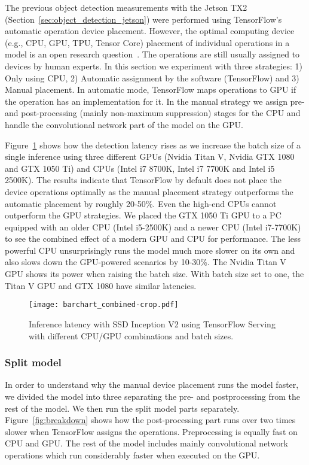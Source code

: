 \documentclass[sigconf]{acmart}
\begin{document}
The previous object detection measurements with the Jetson TX2 (Section~\ref{sec:object_detection_jetson}) were performed using TensorFlow's automatic operation device placement. However, the optimal computing device (e.g., CPU, GPU, TPU, Tensor Core) placement of individual operations in a model is an open research question~\cite{mirhoseini17icml}. The operations are still usually assigned to devices by human experts. In this section we experiment with three strategies: 1) Only using CPU, 2) Automatic assignment by the software (TensorFlow) and 3) Manual placement. In automatic mode, TensorFlow maps operations to GPU if the operation has an implementation for it. In the manual strategy we assign pre- and post-processing (mainly non-maximum suppression) stages for the CPU and handle the convolutional network part of the model on the GPU.

Figure~\ref{fig:barchart_combined} shows how the detection latency rises as we increase the batch size of a single inference using three different GPUs (Nvidia Titan V, Nvidia GTX 1080 and GTX 1050 Ti) and CPUs (Intel i7 8700K, Intel i7 7700K and Intel i5 2500K). The results indicate that TensorFlow by default does not place the device operations optimally as the manual placement strategy outperforms the automatic placement by roughly 20-50\%. Even the high-end CPUs cannot outperform the GPU strategies. We placed the GTX 1050 Ti GPU to a PC equipped with an older CPU (Intel i5-2500K) and a newer CPU (Intel i7-7700K) to see the combined effect of a modern GPU and CPU for performance. The less powerful CPU unsurprisingly runs the model much more slower on its own and also slows down the GPU-powered scenarios by 10-30\%. The Nvidia Titan V GPU shows its power when raising the batch size. With batch size set to one, the Titan V GPU and GTX 1080 have similar latencies.

\begin{figure}[t]
\centering
\texttt{[image: barchart\_combined-crop.pdf]}
\caption{Inference latency with SSD Inception V2 using TensorFlow Serving with different CPU/GPU combinations and batch sizes.}
\label{fig:barchart_combined}
\end{figure}\subsubsection{Split model}

In order to understand why the manual device placement runs the model faster, we divided the model into three separating the pre- and postprocessing from the rest of the model. We then run the split model parts separately. Figure~\ref{fig:breakdown} shows how the post-processing part runs over two times slower when TensorFlow assigns the operations. Preprocessing is equally fast on CPU and GPU. The rest of the model includes mainly convolutional network operations which run considerably faster when executed on the GPU.
\end{document}
